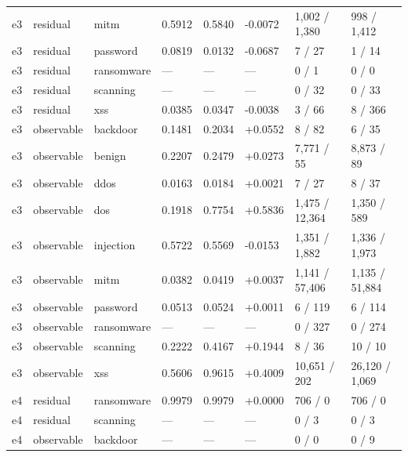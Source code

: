 \begin{landscape}
\begin{longtable}
{}e3 & residual & mitm & 0.5912 & 0.5840 & -0.0072 & 1,002 /\allowbreak{} 1,380 & 998 /\allowbreak{} 1,412 \\
{}e3 & residual & password & 0.0819 & 0.0132 & -0.0687 & 7 /\allowbreak{} 27 & 1 /\allowbreak{} 14 \\
{}e3 & residual & ransomware & — & — & — & 0 /\allowbreak{} 1 & 0 /\allowbreak{} 0 \\
{}e3 & residual & scanning & — & — & — & 0 /\allowbreak{} 32 & 0 /\allowbreak{} 33 \\
{}e3 & residual & xss & 0.0385 & 0.0347 & -0.0038 & 3 /\allowbreak{} 66 & 8 /\allowbreak{} 366 \\
{}e3 & observable & backdoor & 0.1481 & 0.2034 & +\allowbreak{}0.0552 & 8 /\allowbreak{} 82 & 6 /\allowbreak{} 35 \\
{}e3 & observable & benign & 0.2207 & 0.2479 & +\allowbreak{}0.0273 & 7,771 /\allowbreak{} 55 & 8,873 /\allowbreak{} 89 \\
{}e3 & observable & ddos & 0.0163 & 0.0184 & +\allowbreak{}0.0021 & 7 /\allowbreak{} 27 & 8 /\allowbreak{} 37 \\
{}e3 & observable & dos & 0.1918 & 0.7754 & +\allowbreak{}0.5836 & 1,475 /\allowbreak{} 12,364 & 1,350 /\allowbreak{} 589 \\
{}e3 & observable & injection & 0.5722 & 0.5569 & -0.0153 & 1,351 /\allowbreak{} 1,882 & 1,336 /\allowbreak{} 1,973 \\
{}e3 & observable & mitm & 0.0382 & 0.0419 & +\allowbreak{}0.0037 & 1,141 /\allowbreak{} 57,406 & 1,135 /\allowbreak{} 51,884 \\
{}e3 & observable & password & 0.0513 & 0.0524 & +\allowbreak{}0.0011 & 6 /\allowbreak{} 119 & 6 /\allowbreak{} 114 \\
{}e3 & observable & ransomware & — & — & — & 0 /\allowbreak{} 327 & 0 /\allowbreak{} 274 \\
{}e3 & observable & scanning & 0.2222 & 0.4167 & +\allowbreak{}0.1944 & 8 /\allowbreak{} 36 & 10 /\allowbreak{} 10 \\
{}e3 & observable & xss & 0.5606 & 0.9615 & +\allowbreak{}0.4009 & 10,651 /\allowbreak{} 202 & 26,120 /\allowbreak{} 1,069 \\
{}e4 & residual & ransomware & 0.9979 & 0.9979 & +\allowbreak{}0.0000 & 706 /\allowbreak{} 0 & 706 /\allowbreak{} 0 \\
{}e4 & residual & scanning & — & — & — & 0 /\allowbreak{} 3 & 0 /\allowbreak{} 3 \\
{}e4 & observable & backdoor & — & — & — & 0 /\allowbreak{} 0 & 0 /\allowbreak{} 9 \\

\end{longtable}
\end{landscape}
